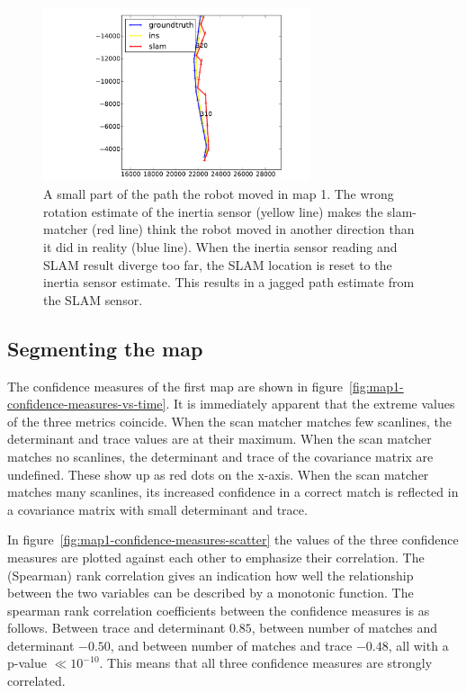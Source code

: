 \begin{figure}[ht]
  \centering
  \includegraphics[width=0.7\textwidth]{images/experiment/map1/ins-problem.pdf}
  \caption{A small part of the path the robot moved in map 1. The wrong rotation estimate of the inertia sensor (yellow line) makes the slam-matcher (red line) think the robot moved in another direction than it did in reality (blue line). When the inertia sensor reading and SLAM result diverge too far, the SLAM location is reset to the inertia sensor estimate. This results in a jagged path estimate from the SLAM sensor.}
  \label{fig:map1-ins-problem}
\end{figure}


\subsection{Segmenting the map}
The confidence measures of the first map are shown in figure~\ref{fig:map1-confidence-measures-vs-time}. It is immediately apparent that the extreme values of the three metrics coincide. When the scan matcher matches few scanlines, the determinant and trace values are at their maximum. When the scan matcher matches no scanlines, the determinant and trace of the covariance matrix are undefined. These show up as red dots on the x-axis. When the scan matcher matches many scanlines, its increased confidence in a correct match is reflected in a covariance matrix with small determinant and trace.

In figure~\ref{fig:map1-confidence-measures-scatter} the values of the three confidence measures are plotted against each other to emphasize their correlation. The (Spearman) rank correlation gives an indication how well the relationship between the two variables can be described by a monotonic function. The spearman rank correlation coefficients between the confidence measures is as follows. Between trace and determinant $0.85$, between number of matches and determinant $-0.50$, and between number of matches and trace $-0.48$, all with a p-value $\ll 10^{-10}$. This means that all three confidence measures are strongly correlated.

